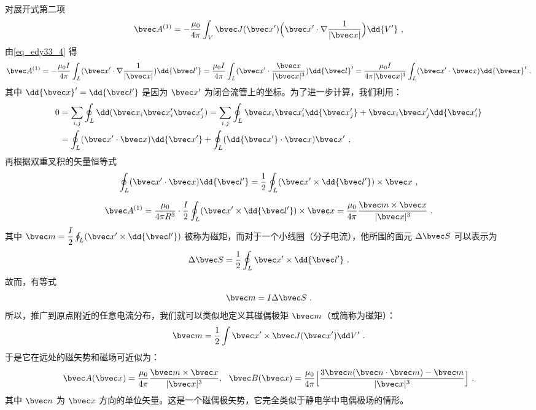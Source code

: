 对展开式第二项
\begin{equation}
\bvec A^{(1)}=-\dfrac{\mu_0 }{4\pi}\int_V \bvec J(\bvec x^{\prime})\Big (\bvec x^{\prime}\cdot\nabla\dfrac{1}{|\bvec x|}\Big)\dd{V^{\prime}}\label{eq_edy33_6}~,
\end{equation}
由\autoref{eq_edy33_4} 得
\begin{equation}
\bvec A^{(1)}=-\dfrac{\mu_0 I }{4\pi}\int_L (\bvec x^{\prime}\cdot\nabla\dfrac{1}{|\bvec x|}) \dd{\bvec l'}=\dfrac{\mu_0 I }{4\pi}\int_L (\bvec x^{\prime}\cdot\dfrac{\bvec x}{|\bvec x|^3})\dd {\bvec l}^{\prime}
=\dfrac{\mu_0 I }{4\pi|\bvec x|^3}\int_L (\bvec x^{\prime}\cdot \bvec x)\dd {\bvec x}^{\prime}
\label{eq_edy33_7}~.
\end{equation}
其中 $\dd{\bvec x}^{\prime}=\dd{\bvec l'}$ 是因为 $ \bvec x^{\prime}$ 为闭合流管上的坐标。为了进一步计算，我们利用：
\begin{equation}
\begin{aligned}
0&=\sum_{i,j}\oint_L \dd(\bvec x_i \bvec x'_i \bvec x'_j)=\sum_{i,j}\oint_L \bvec x_i \bvec x'_i \dd {\bvec x'_j} + \bvec x_i \bvec x'_j \dd {\bvec x'_i}\\
&=
\oint_L (\bvec x^{\prime}\cdot\bvec x)\dd {\bvec x'}+\oint_L (\dd {\bvec x'}\cdot \bvec x)\bvec x^{\prime}~,
\end{aligned}
\end{equation}
再根据双重叉积的矢量恒等式
\begin{equation}
\oint_L (\bvec x^{\prime}\cdot \bvec x)\dd{\bvec l'}=\dfrac1 2\oint_L (\bvec x^{\prime}\times \dd{\bvec l'})\times \bvec x \label{eq_edy33_9}~,
\end{equation}

\begin{equation}
\bvec A^{(1)}=\dfrac{\mu_0}{4\pi R^3}\cdot\dfrac{I}{2}\oint_L (\bvec x^{\prime}\times \dd{\bvec l'})\times \bvec x=\dfrac{\mu_0}{4\pi}\dfrac{\bvec m \times \bvec x}{|\bvec x|^3}\label{eq_edy33_10}~.
\end{equation}
其中 $\bvec m =\dfrac{I}{2}\oint_L (\bvec x^{\prime}\times \dd{\bvec l'})$ 被称为磁矩，而对于一个小线圈（分子电流），他所围的面元 $\Delta\bvec S$ 可以表示为
\begin{equation}
\Delta\bvec S=\dfrac 1 2\oint_L \bvec x^{\prime}\times \dd{\bvec l'}~.
\end{equation}
故而，有等式
\begin{equation}
\bvec m=I\Delta \bvec S~.
\end{equation}
所以，推广到原点附近的任意电流分布，我们就可以类似地定义其磁偶极矩 $\bvec m$（或简称为磁矩）：
\begin{equation}
\bvec m=\frac{1}{2}\int \bvec x' \times \bvec J(\bvec x') \dd V'~.
\end{equation}
于是它在远处的磁矢势和磁场可近似为：
\begin{equation}
\bvec A(\bvec x)=\frac{\mu_0}{4\pi}\frac{\bvec m\times \bvec x}{|\bvec x|^3},\ \ 
\bvec B(\bvec x)=\frac{\mu_0}{4\pi}\Big [\frac{3\bvec n(\bvec n\cdot \bvec m)-\bvec m}{|\bvec x|^3}\Big]~.
\end{equation}
其中 $\bvec n$ 为 $\bvec x$ 方向的单位矢量。这是一个磁偶极矢势，它完全类似于静电学中电偶极场的情形。